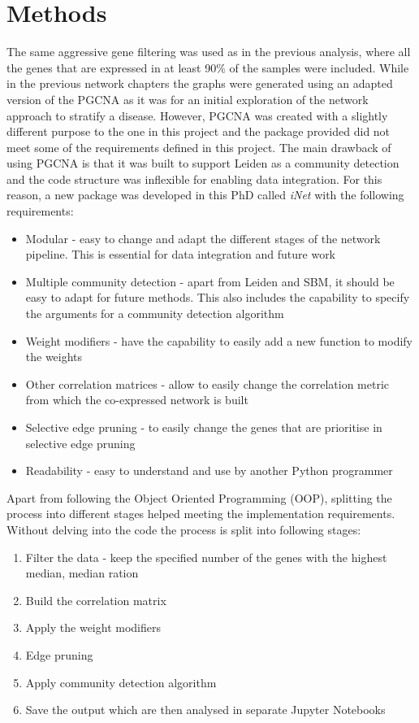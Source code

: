 \section{Methods} \label{Sec:N_II:methods}

The same aggressive gene filtering was used as in the previous analysis, where all the genes that are expressed in at least 90\% of the samples were included. While in the previous network chapters the graphs were generated using an adapted version of the PGCNA as it was for an initial exploration of the network approach to stratify a disease. However, PGCNA was created with a slightly different purpose to the one in this project and the package provided did not meet some of the requirements defined in this project. The main drawback of using PGCNA is that it was built to support Leiden as a community detection and the code structure was inflexible for enabling data integration. For this reason, a new package was developed in this PhD called \textit{iNet} with the following requirements: 

\begin{itemize}
    \item Modular - easy to change and adapt the different stages of the network pipeline. This  is essential for data integration and future work
    \item Multiple community detection - apart from Leiden and SBM, it should be easy to adapt for future methods. This also includes the capability to specify the arguments for a community detection algorithm
    \item Weight modifiers - have the capability to easily add a new function to modify the weights
    \item Other correlation matrices - allow to easily change the correlation metric from which the co-expressed network is built
    \item Selective edge pruning - to easily change the genes that are prioritise in selective edge pruning 
    \item Readability - easy to understand and use by another Python programmer
\end{itemize}

Apart from following the Object Oriented Programming (OOP), splitting the process into different stages helped meeting the implementation requirements. Without delving into the code the process is split into following stages:
\begin{enumerate}
    \item Filter the data - keep the specified number of the genes with the highest median, median ration
    \item Build the correlation matrix
    \item Apply the weight modifiers
    \item Edge pruning
    \item Apply community detection algorithm
    \item Save the output which are then analysed in separate Jupyter Notebooks
\end{enumerate}

